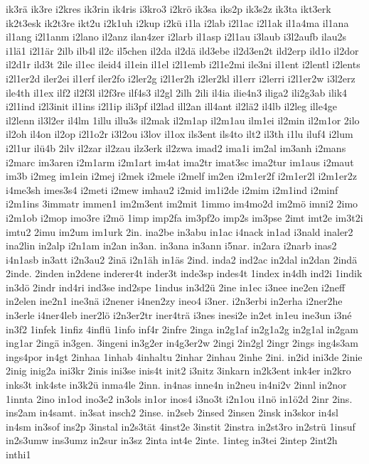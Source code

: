 {ik3rä
ik3re
i2kres
ik3rin
ik4ris
i3kro3
i2krö
ik3sa
iks2p
ik3s2z
ik3ta
ikt3erk
ik2t3esk
ik2t3re
ikt2u
i2k1uh
i2kup
i2kü
i1la
i2lab
i2l1ac
i2l1ak
il1a4ma
il1ana
il1ang
i2l1anm
i2lano
il2anz
ilan4zer
i2larb
il1asp
i2l1au
i3laub
i3l2aufb
ilau2s
i1lä1
i2l1är
2ilb
ilb4l
il2c
il5chen
il2da
il2dä
ild3ebe
il2d3en2t
ild2erp
ild1o
il2dor
il2d1r
ild3t
2ile
il1ec
ileid4
il1ein
il1el
i2l1emb
i2l1e2mi
ile3ni
il1ent
i2lentl
i2lents
i2l1er2d
iler2ei
il1erf
iler2fo
i2ler2g
i2l1er2h
i2ler2kl
il1err
i2lerri
i2l1er2w
i3l2erz
ile4th
il1ex
ilf2
il2f3l
il2f3re
ilf4s3
il2gl
2ilh
2ili
il4ia
ilie4n3
iliga2
ili2g3ab
ilik4
i2l1ind
i2l3init
il1ins
i2l1ip
ili3pf
il2lad
ill2an
ill4ant
il2lä2
il4lb
il2leg
ille4ge
il2lenn
il3l2er
il4lm
1illu
illu3s
il2mak
il2m1ap
il2m1au
ilm1ei
il2min
il2m1or
2ilo
il2oh
il4on
il2op
i2l1o2r
i3l2ou
i3lov
il1ox
ils3ent
ils4to
ilt2
il3th
i1lu
iluf4
i2lum
i2l1ur
ilü4b
2ilv
il2zar
il2zau
ilz3erk
il2zwa
imad2
ima1i
im2al
im3anh
i2mans
i2marc
im3aren
i2m1arm
i2m1art
im4at
ima2tr
imat3sc
ima2tur
im1aus
i2maut
im3b
i2meg
im1ein
i2mej
i2mek
i2mele
i2melf
im2en
i2m1er2f
i2m1er2l
i2m1er2z
i4me3sh
imes3s4
i2meti
i2mew
imhau2
i2mid
im1i2de
i2mim
i2m1ind
i2minf
i2m1ins
3immatr
immen1
im2m3ent
im2mit
1immo
im4mo2d
im2mö
imni2
2imo
i2m1ob
i2mop
imo3re
i2mö
1imp
imp2fa
im3pf2o
imp2s
im3pse
2imt
imt2e
im3t2i
imtu2
2imu
im2um
im1urk
2in.
ina2be
in3abu
in1ac
i4nack
in1ad
i3nald
inaler2
ina2lin
in2alp
i2n1am
in2an
in3an.
in3ana
in3ann
i5nar.
in2ara
i2narb
inas2
i4n1asb
in3att
i2n3au2
2inä
i2n1äh
in1äs
2ind.
inda2
ind2ac
in2dal
in2dan
2indä
2inde.
2inden
in2dene
inderer4t
inder3t
inde3sp
indes4t
1index
in4dh
ind2i
1indik
in3dö
2indr
ind4ri
ind3se
ind2spe
1indus
in3d2ü
2ine
in1ec
i3nee
ine2en
i2neff
in2elen
ine2n1
ine3nä
i2nener
i4nen2zy
ineo4
i3ner.
i2n3erbi
in2erha
i2ner2he
in3erle
i4ner4leb
iner2lö
i2n3er2tr
iner4trä
i3nes
inesi2e
in2et
in1eu
ine3un
i3né
in3f2
1infek
1infiz
4inflü
1info
inf4r
2infre
2inga
in2g1af
in2g1a2g
in2g1al
in2gam
ing1ar
2ingä
in3gen.
3ingeni
in3g2er
in4g3er2w
2ingi
2in2gl
2ingr
2ings
ing4s3am
ings4por
in4gt
2inhaa
1inhab
4inhaltu
2inhar
2inhau
2inhe
2ini.
in2id
ini3de
2inie
2inig
inig2a
ini3kr
2inis
ini3se
inis4t
init2
i3nitz
3inkarn
in2k3ent
ink4er
in2kro
inks3t
ink4ste
in3k2ü
inma4le
2inn.
in4nas
inne4n
in2neu
in4ni2v
2innl
in2nor
1innta
2ino
in1od
ino3e2
in3ols
in1or
inos4
i3no3t
i2n1ou
i1nö
in1ö2d
2inr
2ins.
ins2am
in4samt.
in3sat
insch2
2inse.
in2seb
2insed
2insen
2insk
in3skor
in4sl
in4sm
in3sof
ins2p
3instal
in2s3tät
4inst2e
3instit
2instra
in2st3ro
in2strü
1insuf
in2s3umw
ins3umz
in2sur
in3sz
2inta
int4e
2inte.
1integ
in3tei
2intep
2int2h
inthi1
}
